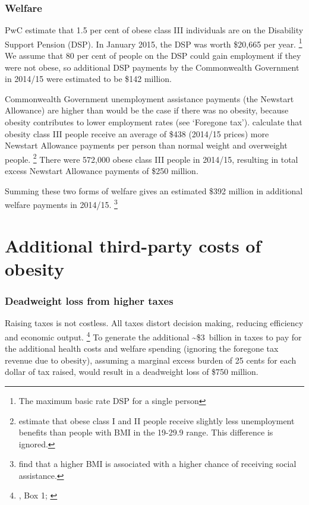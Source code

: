 \documentclass[embargoed]{grattan}
\begin{document}
\subsubsection{Welfare}\label{welfare}

PwC estimate that 1.5 per cent of obese class III individuals are on the Disability Support Pension (DSP).
In January 2015, the DSP was worth \$20,665 per year.%
\footnote{The maximum basic rate DSP for a single person} We assume that 80 per cent of people on the DSP could gain employment if they were not obese, so additional DSP payments by the Commonwealth Government in 2014/15 were estimated to be \$142 million.

Commonwealth Government unemployment assistance payments (the Newstart Allowance) are higher than would be the case if there was no obesity, because obesity contributes to lower employment rates (see `Foregone tax'). \textcite{Colagiuri2010costoverweightobesity} calculate that obesity class III people receive an average of \$438 (2014/15 prices) more Newstart Allowance payments per person than normal weight and overweight people.%
\footnote{\textcite{Colagiuri2010costoverweightobesity} estimate that obese class I and II people receive slightly less unemployment benefits than people with BMI in the 19-29.9 range.
This difference is ignored.} There were 572,000 obese class III people in 2014/15, resulting in total excess Newstart Allowance payments of \$250 million.

Summing these two forms of welfare gives an estimated \$392 million in additional welfare payments in 2014/15.%
\footnote{\textcite{Boeckerman2016EffectWeightLabor} find that a higher BMI is associated with a higher chance of receiving social assistance.}

\section{Additional third-party costs of obesity }\label{additional-third-party-costs-of-obesity}

\subsubsection{Deadweight loss from higher taxes}\label{deadweight-loss-from-higher-taxes}

Raising taxes is not costless.
All taxes distort decision making, reducing efficiency and economic output.%
\footnote{\textcite{Daley2015Propertytaxes}, Box 1; \textcite{Freebairn2010Taxationobesity}} To generate the additional \textasciitilde{}\$3~billion in taxes to pay for the additional health costs and welfare spending (ignoring the foregone tax revenue due to obesity), assuming a marginal excess burden of 25 cents for each dollar of tax raised, would result in a deadweight loss of \$750 million.
\end{document}
